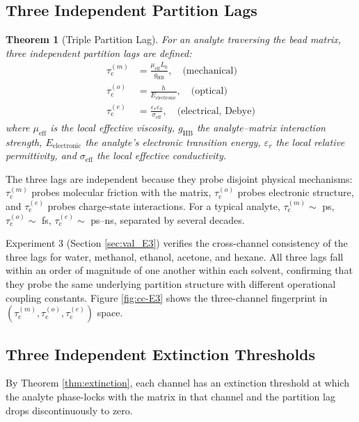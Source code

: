 \documentclass[twocolumn,10pt,a4paper]{article}
\newtheorem{theorem}{Theorem}[section]
\theoremstyle{definition}
\theoremstyle{remark}
\newcommand{\tauM}{\tau_{\mathrm{c}}^{(m)}}
\newcommand{\tauO}{\tau_{\mathrm{c}}^{(o)}}
\newcommand{\tauE}{\tau_{\mathrm{c}}^{(e)}}
\begin{document}
\subsection{Three Independent Partition Lags}

\begin{theorem}[Triple Partition Lag]
\label{thm:triple_lag}
For an analyte traversing the bead matrix, three independent partition lags are defined:
\begin{align}
\tauM &= \frac{\mu_{\mathrm{eff}} L_0}{g_{\mathrm{HB}}}, \quad \text{(mechanical)}\\
\tauO &= \frac{h}{E_{\mathrm{electronic}}}, \quad \text{(optical)}\\
\tauE &= \frac{\varepsilon_r \varepsilon_0}{\sigma_{\mathrm{eff}}}, \quad \text{(electrical, Debye)}
\end{align}
where $\mu_{\mathrm{eff}}$ is the local effective viscosity, $g_{\mathrm{HB}}$ the analyte--matrix interaction strength, $E_{\mathrm{electronic}}$ the analyte's electronic transition energy, $\varepsilon_r$ the local relative permittivity, and $\sigma_{\mathrm{eff}}$ the local effective conductivity.
\end{theorem}

The three lags are independent because they probe disjoint physical mechanisms: $\tauM$ probes molecular friction with the matrix, $\tauO$ probes electronic structure, and $\tauE$ probes charge-state interactions. For a typical analyte, $\tauM \sim$ ps, $\tauO \sim$ fs, $\tauE \sim$ ps--ns, separated by several decades.

Experiment 3 (Section \ref{sec:val_E3}) verifies the cross-channel consistency of the three lags for water, methanol, ethanol, acetone, and hexane. All three lags fall within an order of magnitude of one another within each solvent, confirming that they probe the same underlying partition structure with different operational coupling constants. Figure \ref{fig:cc-E3} shows the three-channel fingerprint in $(\tauM, \tauO, \tauE)$ space.

\subsection{Three Independent Extinction Thresholds}

By Theorem \ref{thm:extinction}, each channel has an extinction threshold at which the analyte phase-locks with the matrix in that channel and the partition lag drops discontinuously to zero.
\end{document}
